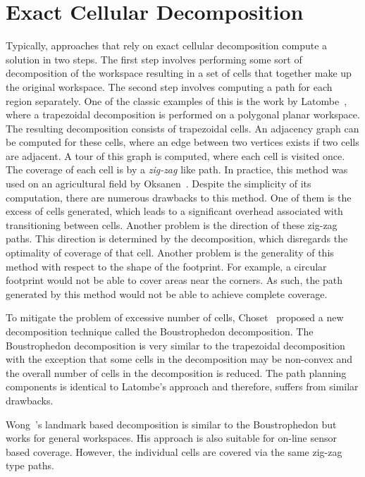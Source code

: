 \documentclass[../main.tex]{subfiles}
\begin{document}
\section{Exact Cellular Decomposition}
\label{section:exact_cellular_decomposition}

Typically, approaches that rely on exact cellular decomposition compute a solution in two steps. The first step involves performing some sort of decomposition of the workspace resulting in a set of cells that together make up the original workspace. The second step involves computing a path for each region separately. One of the classic examples of this is the work by Latombe~\cite{latombe1991exact}, where a trapezoidal decomposition is performed on a polygonal planar workspace. The resulting decomposition consists of trapezoidal cells. An adjacency graph can be computed for these cells, where an edge between two vertices exists if two cells are adjacent. A tour of this graph is computed, where each cell is visited once. The coverage of each cell is by a \emph{zig-zag} like path.  In practice, this method was used on an agricultural field by Oksanen~\cite{Oksanen2009coverage}. Despite the simplicity of its computation, there are numerous drawbacks to this method. One of them is the excess of cells generated, which leads to a significant overhead associated with transitioning between cells. Another problem is the direction of these zig-zag paths. This direction is determined by the decomposition, which disregards the optimality of coverage of that cell. Another problem is the generality of this method with respect to the shape of the footprint. For example, a circular footprint would not be able to cover areas near the corners. As such, the path generated by this method would not be able to achieve complete coverage.

To mitigate the problem of excessive number of cells, Choset~\cite{choset2000coverage} proposed a new decomposition technique called the Boustrophedon decomposition. The Boustrophedon decomposition is very similar to the trapezoidal decomposition with the exception that some cells in the decomposition may be non-convex and the overall number of cells in the decomposition is reduced. The path planning components is identical to Latombe's approach and therefore, suffers from similar drawbacks.

Wong~\cite{wong2004complete}'s landmark based decomposition is similar to the Boustrophedon but works for general workspaces. His approach is also suitable for on-line sensor based coverage. However, the individual cells are covered via the same zig-zag type paths.
\end{document}

